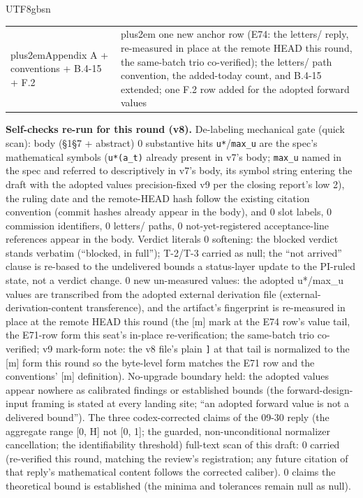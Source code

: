 \documentclass[11pt,letterpaper]{article}
\newcommand{\RaggedRight}{\rightskip=0pt plus2em\relax}
\begin{document}
\begin{CJK}{UTF8}{gbsn}
{\begin{longtable}{>{\RaggedRight\arraybackslash}p{6.85cm} >{\RaggedRight\arraybackslash}p{6.85cm}}
Appendix A + conventions + B.4-15 + F.2 & one new anchor row (E74: the letters/ reply, re-measured in place at the remote HEAD this round, the same-batch trio co-verified); the letters/ path convention, the added-today count, and B.4-15 extended; one F.2 row added for the adopted forward values \\
\end{longtable}}

\textbf{Self-checks re-run for this round (v8).} De-labeling mechanical gate (quick scan): body (\S{}1\textendash{}\S{}7 + abstract) 0 substantive hits \textemdash{} \texttt{u*}/\texttt{max\_u} are the spec's mathematical symbols (\texttt{u*(a\_t)} already present in v7's body; \texttt{max\_u} named in the spec and referred to descriptively in v7's body, its symbol string entering the draft with the adopted values \textemdash{} precision-fixed v9 per the closing report's low 2), the ruling date and the remote-HEAD hash follow the existing citation convention (commit hashes already appear in the body), and 0 slot labels, 0 commission identifiers, 0 letters/ paths, 0 not-yet-registered acceptance-line references appear in the body. Verdict literals 0 softening: the blocked verdict stands verbatim (``blocked, in full''); T-2/T-3 carried as null; the ``not arrived'' clause is re-based to the undelivered bounds \textemdash{} a status-layer update to the PI-ruled state, not a verdict change. 0 new un-measured values: the adopted u*/max\_u values are transcribed from the adopted external derivation file (external-derivation-content transference), and the artifact's fingerprint is re-measured in place at the remote HEAD this round (the [m] mark at the E74 row's value tail, the E71-row form \textemdash{} this seat's in-place re-verification; the same-batch trio co-verified; v9 mark-form note: the v8 file's plain \texttt{]} at that tail is normalized to the [m] form this round so the byte-level form matches the E71 row and the conventions' [m] definition). No-upgrade boundary held: the adopted values appear nowhere as calibrated findings or established bounds (the forward-design-input framing is stated at every landing site; ``an adopted forward value is not a delivered bound''). The three codex-corrected claims of the 09-30 reply (the aggregate range [0, H] not [0, 1]; the guarded, non-unconditional normalizer cancellation; the identifiability threshold) \textemdash{} full-text scan of this draft: 0 carried (re-verified this round, matching the review's registration; any future citation of that reply's mathematical content follows the corrected caliber). 0 claims the theoretical bound is established (the minima and tolerances remain null as null).


\end{CJK}
\end{document}
